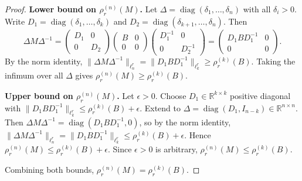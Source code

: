 \begin{proof}
\textbf{Lower bound on $\rho_r^{(n)}(M)$.}
Let $\Delta=\operatorname{diag}(\delta_1,\dots,\delta_n)$ with all $\delta_i>0$.
Write $D_1=\operatorname{diag}(\delta_1,\dots,\delta_k)$ and $D_2=\operatorname{diag}(\delta_{k+1},\dots,\delta_n)$.
Then
\[
\Delta M\Delta^{-1}
=
\begin{pmatrix}D_1&0\\0&D_2\end{pmatrix}
\begin{pmatrix}B&0\\0&0\end{pmatrix}
\begin{pmatrix}D_1^{-1}&0\\0&D_2^{-1}\end{pmatrix}
=
\begin{pmatrix}D_1BD_1^{-1}&0\\0&0\end{pmatrix}.
\]
By the norm identity,
$\|\Delta M\Delta^{-1}\|_{\ell^r_n}=\|D_1BD_1^{-1}\|_{\ell^r_k}\ge\rho_r^{(k)}(B)$.
Taking the infimum over all $\Delta$ gives $\rho_r^{(n)}(M)\ge\rho_r^{(k)}(B)$.

\textbf{Upper bound on $\rho_r^{(n)}(M)$.}
Let $\epsilon>0$. Choose $D_1\in\mathbb{R}^{k\times k}$ positive diagonal with $\|D_1BD_1^{-1}\|_{\ell^r_k}\le\rho_r^{(k)}(B)+\epsilon$.
Extend to $\Delta=\operatorname{diag}(D_1,I_{n-k})\in\mathbb{R}^{n\times n}$. Then
$\Delta M\Delta^{-1}=\operatorname{diag}(D_1BD_1^{-1},0)$,
so by the norm identity,
$\|\Delta M\Delta^{-1}\|_{\ell^r_n}=\|D_1BD_1^{-1}\|_{\ell^r_k}\le\rho_r^{(k)}(B)+\epsilon$.
Hence $\rho_r^{(n)}(M)\le\rho_r^{(k)}(B)+\epsilon$. Since $\epsilon>0$ is arbitrary, $\rho_r^{(n)}(M)\le\rho_r^{(k)}(B)$.

Combining both bounds, $\rho_r^{(n)}(M)=\rho_r^{(k)}(B)$.
\end{proof}
